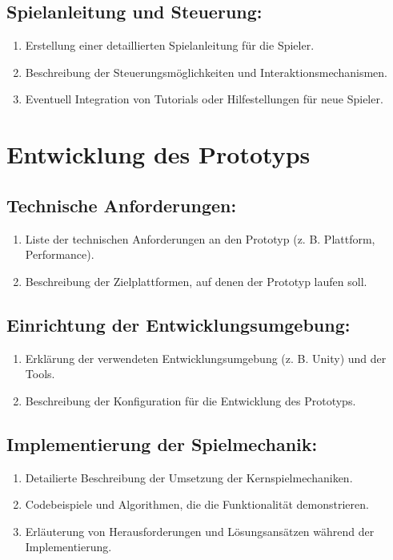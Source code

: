 \subsection{Spielanleitung und Steuerung:}
\begin{enumerate}
  \item Erstellung einer detaillierten Spielanleitung für die Spieler.
  \item Beschreibung der Steuerungsmöglichkeiten und Interaktionsmechanismen.
  \item Eventuell Integration von Tutorials oder Hilfestellungen für neue Spieler.
\end{enumerate}

\section{Entwicklung des Prototyps}
\subsection{Technische Anforderungen:}
\begin{enumerate}
  \item Liste der technischen Anforderungen an den Prototyp (z. B. Plattform, Performance).
  \item Beschreibung der Zielplattformen, auf denen der Prototyp laufen soll.
\end{enumerate}

\subsection{Einrichtung der Entwicklungsumgebung:}
\begin{enumerate}
  \item Erklärung der verwendeten Entwicklungsumgebung (z. B. Unity) und der Tools.
  \item Beschreibung der Konfiguration für die Entwicklung des Prototyps.
\end{enumerate}

\subsection{Implementierung der Spielmechanik:}
\begin{enumerate}
  \item Detailierte Beschreibung der Umsetzung der Kernspielmechaniken.
  \item Codebeispiele und Algorithmen, die die Funktionalität demonstrieren.
  \item Erläuterung von Herausforderungen und Lösungsansätzen während der Implementierung.
\end{enumerate}

